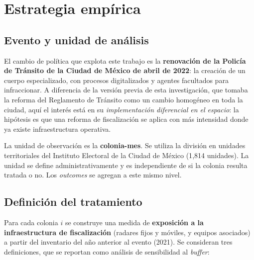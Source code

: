 \chapter{Estrategia empírica}
\label{chap:estrategia}


\section{Evento y unidad de análisis}

El cambio de política que explota este trabajo es la \textbf{renovación de la
Policía de Tránsito de la Ciudad de México de abril de 2022}: la creación de un
cuerpo especializado, con procesos digitalizados y agentes facultados para
infraccionar. A diferencia de la versión previa de esta investigación, que
tomaba la reforma del Reglamento de Tránsito como un cambio homogéneo en toda la
ciudad, aquí el interés está en su \emph{implementación diferencial en el
espacio}: la hipótesis es que una reforma de fiscalización se aplica con más
intensidad donde ya existe infraestructura operativa.

La unidad de observación es la \textbf{colonia-mes}. Se utiliza la división en
unidades territoriales del Instituto Electoral de la Ciudad de México
(1{,}814 unidades). La unidad se define administrativamente y es independiente
de si la colonia resulta tratada o no. Los \emph{outcomes} se agregan a este
mismo nivel.

\section{Definición del tratamiento}

Para cada colonia $i$ se construye una medida de \textbf{exposición a la
infraestructura de fiscalización} (radares fijos y móviles, y equipos
asociados) a partir del inventario del año anterior al evento (2021). Se
consideran tres definiciones, que se reportan como análisis de sensibilidad al
\emph{buffer}:

